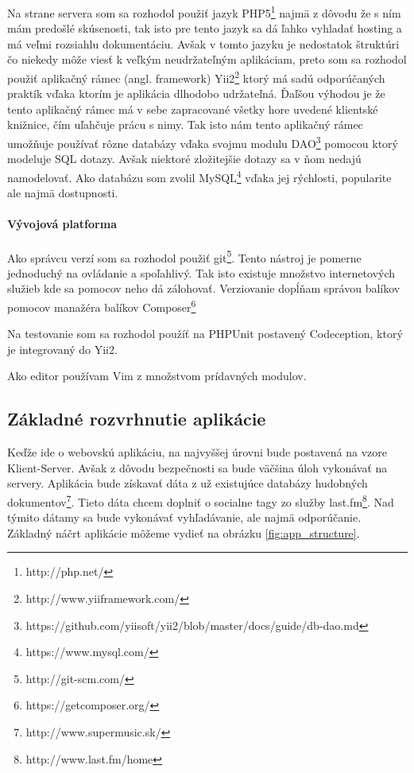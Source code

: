 Na strane servera som sa rozhodol použiť jazyk PHP5\footnote{http://php.net/}
najmä z dôvodu že s ním mám predošlé 
skúsenosti, tak isto pre tento jazyk sa dá ľahko vyhladať hosting a má veľmi rozsiahlu 
dokumentáciu. Avšak v tomto jazyku je nedostatok štruktúri čo niekedy môže viesť k veľkým
neudržateľným aplikáciam, preto som sa rozhodol použiť aplikačný rámec (angl. framework) 
Yii2\footnote{http://www.yiiframework.com/} ktorý má sadú odporúčaných praktík vďaka
ktorím je aplikácia dlhodobo udržateľná.
Ďaľšou výhodou je že tento aplikačný rámec má v sebe zapracované všetky hore uvedené
klientské knižnice, čím uľahčuje prácu s nimy.
Tak isto nám tento aplikačný rámec umožňuje používať rôzne databázy vďaka svojmu modulu 
DAO\footnote{https://github.com/yiisoft/yii2/blob/master/docs/guide/db-dao.md}
pomocou ktorý modeluje SQL dotazy. Avšak niektoré zložitejšie dotazy sa v ňom nedajú
namodelovať. Ako databázu som zvolil MySQL\footnote{https://www.mysql.com/}
vďaka jej rýchlosti, popularite ale najmä dostupnosti.

\paragraph{Vývojová platforma}

Ako správcu verzí som sa rozhodol použiť git\footnote{http://git-scm.com/}.
Tento nástroj je pomerne jednoduchý na 
ovládanie a spoľahlivý. Tak isto existuje množstvo internetových služieb kde sa pomocov
neho dá zálohovať. Verziovanie dopĺňam správou balíkov pomocov manažéra balíkov 
Composer\footnote{https://getcomposer.org/}

Na testovanie som sa rozhodol použíť na PHPUnit postavený Codeception, ktorý 
je integrovaný do Yii2.

Ako editor používam Vim z množstvom prídavných modulov.

\subsection{Základné rozvrhnutie aplikácie}

Keďže ide o webovskú aplikáciu, na najvyššej úrovni bude postavená na vzore 
Klient-Server. Avšak z dôvodu bezpečnosti sa bude väčšina úloh vykonávať na servery.
Aplikácia bude získavať dáta z už existujúce databázy
hudobných dokumentov\footnote{http://www.supermusic.sk/}.
Tieto dáta chcem doplniť o socialne tagy zo služby
last.fm\footnote{http://www.last.fm/home}.
Nad týmito dátamy sa bude vykonávať vyhľadávanie, ale najmä 
odporúčanie. Základný náčrt aplikácie môžeme vydieť na 
obrázku \ref{fig:app_structure}.


